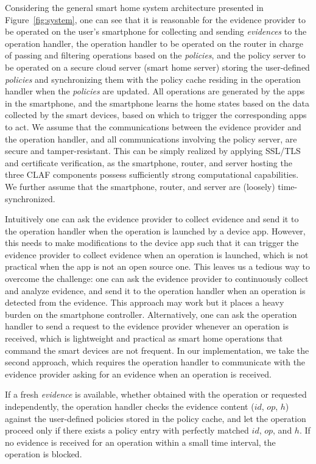 \documentclass[letterpaper,12pt]{article}
\begin{document}
Considering the general smart home system architecture presented in Figure~\ref{fig:system}, one can see that it is reasonable for the evidence provider to be operated on the user's smartphone for collecting and sending \textit{evidences} to the operation handler, the operation handler to be operated on the router in charge of passing and filtering operations based on the \textit{policies}, and the policy server to be operated on a secure cloud server (smart home server) storing the user-defined \textit{policies} and synchronizing them with the policy cache residing in the operation handler when the \textit{policies} are updated. All operations are generated by the apps in the smartphone, and the smartphone learns the home states based on the data collected by the smart devices, based on which to trigger the corresponding apps to act. We assume that the communications between the evidence provider and the operation handler, and all communications involving the policy server, are secure and tamper-resistant. This can be simply realized by applying SSL/TLS and certificate verification, as the smartphone, router, and server hosting the three CLAF components possess sufficiently strong computational capabilities.  We further assume that the smartphone, router, and server are (loosely) time-synchronized. 

Intuitively one can ask the evidence provider to collect evidence and send it to the operation handler when the operation is launched by a device app. However, this needs to make modifications to the device app such that it can trigger the evidence provider to collect evidence when an operation is launched, which is not practical when the app is not an open source one. This leaves us a tedious way to overcome the challenge: one can ask the evidence provider to continuously collect  and analyze evidence, and send it to the operation handler when an operation is detected from the evidence. This approach may work but it places a heavy burden on the smartphone controller. Alternatively, one can ask the operation handler to send a request to the evidence provider whenever an operation is received, which is lightweight and practical as smart home operations that command the smart devices are not frequent. In our implementation, we take the second approach, which requires the operation handler to communicate with the evidence provider asking for an evidence when an operation is received. 

If a fresh \textit{evidence} is available, whether obtained with the operation or requested independently, the operation handler checks the evidence content ($id$, $op$, $h$) against the user-defined policies stored in the policy cache, and let the operation proceed only if there exists a policy entry with perfectly matched $id$, $op$, and $h$. If no evidence is received for an operation within a small time interval, the operation is blocked. 
\end{document}
